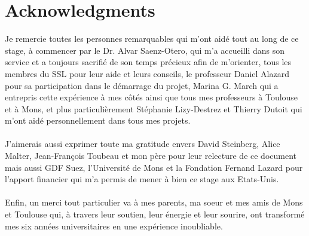 \section*{Acknowledgments}
Je remercie toutes les personnes remarquables qui m'ont aid\'{e} tout au long de ce stage, \`{a} commencer par le Dr. Alvar Saenz-Otero, qui m'a accueilli dans son service et a toujours sacrifi\'{e} de son temps pr\'{e}cieux afin de m'orienter, tous les membres du SSL pour leur aide et leurs conseils, le professeur Daniel Alazard pour sa participation dans le d\'{e}marrage du projet, Marina G. March qui a entrepris cette exp\'{e}rience \`{a} mes c\^{o}t\'{e}s ainsi que tous mes professeurs \`{a} Toulouse et \`{a} Mons, et plus particuli\`{e}rement St\'{e}phanie Lizy-Destrez et Thierry Dutoit qui m'ont aid\'{e} personnellement dans tous mes projets.\\\\
J'aimerais aussi exprimer toute ma gratitude envers David Steinberg, Alice Malter, Jean-Fran\c{c}ois Toubeau et mon p\`{e}re pour leur relecture de ce document mais aussi GDF Suez, l'Universit\'{e} de Mons et la Fondation Fernand Lazard pour l'apport financier qui m'a permis de mener \`{a} bien ce stage aux Etats-Unis.\\\\
Enfin, un merci tout particulier va \`{a} mes parents, ma soeur et mes amis de Mons et Toulouse qui, \`{a} travers leur soutien, leur \'{e}nergie et leur sourire, ont transform\'{e} mes six ann\'{e}es universitaires en une exp\'{e}rience inoubliable.

